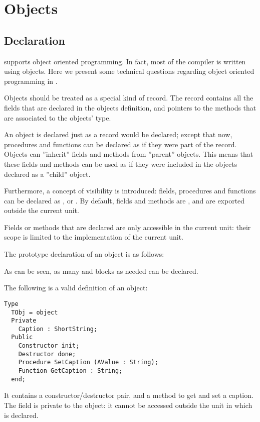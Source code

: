 \chapter{Objects}
\label{ch:Objects}

\section{Declaration}
\fpc supports object oriented programming. In fact, most  of the compiler is
written using objects. Here we present some technical questions regarding
object oriented programming in \fpc.

Objects should be treated as a special kind of record. The record contains
all the fields that are declared in the objects definition, and pointers
to the methods that are associated to the objects' type.

An object is declared just as a record would be declared; except that
now, procedures and functions can be declared as if they were part of the record.
Objects can ''inherit'' fields and methods from ''parent'' objects. This means
that these fields and methods can be used as if they were included in the
objects declared as a ''child'' object.

Furthermore, a concept of visibility  is introduced: 
fields, procedures and functions can be declared as ,
 or 
. By default, fields and methods are , and 
are exported outside the current unit. 

Fields or methods that are declared  are only accessible 
in the current unit: their scope is limited to the implementation of the
current unit.

The prototype declaration of an object is as follows:

As can be seen, as many  and  blocks as needed can be
declared.

The following is a valid definition of an object:
\begin{verbatim}
Type
  TObj = object
  Private
    Caption : ShortString;
  Public
    Constructor init;
    Destructor done;
    Procedure SetCaption (AValue : String);
    Function GetCaption : String;
  end;
\end{verbatim}
It contains a constructor/destructor pair, and a method to get and set a
caption. The  field is private to the object: it cannot be accessed
outside the unit in which  is declared.

